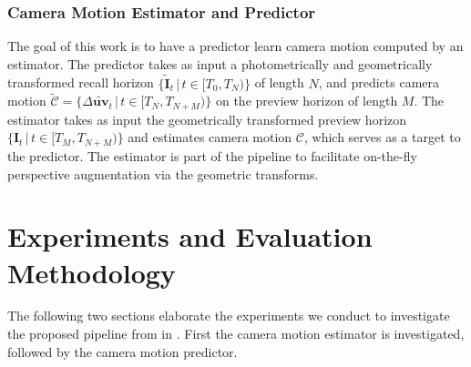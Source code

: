 \subsubsection{Camera Motion Estimator and Predictor}
\label{c4:sec:camera_motion_estimator_and_predictor}
The goal of this work is to have a predictor learn camera motion computed by an estimator.
The predictor takes as input a photometrically and geometrically transformed recall horizon $\{\tilde{\mathbf{I}}_t\,|\,t\in[T_0, T_N)\}$ of length $N$, and predicts camera motion $\tilde{\mathcal{C}} = \{\Delta \tilde{\mathbf{uv}}_t\,|\,t\in[T_N,T_{N+M})\}$ on the preview horizon of length $M$. The estimator takes as input the geometrically transformed preview horizon $\{\mathbf{I}_t\,|\,t\in[T_M, T_{N+M})\}$ and estimates camera motion $\mathcal{C}$, which serves as a target to the predictor. The estimator is part of the pipeline to facilitate on-the-fly perspective augmentation via the geometric transforms.




\section{Experiments and Evaluation Methodology}
The following two sections elaborate the experiments we conduct to investigate the proposed pipeline from  in . First the camera motion estimator is investigated, followed by the camera motion predictor.

